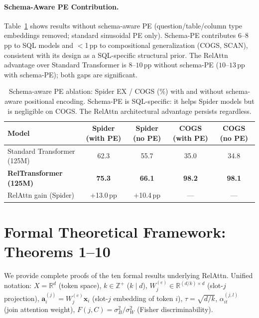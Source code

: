 \documentclass[conference]{IEEEtran}
\begin{document}
\paragraph{Schema-Aware PE Contribution.}
Table~\ref{tab:schema_pe_ablation} shows results without schema-aware PE (question/table/column type embeddings removed; standard sinusoidal PE only). Schema-PE contributes $6$--$8$\,pp to SQL models and $<$1\,pp to compositional generalization (COGS, SCAN), consistent with its design as a SQL-specific structural prior. The RelAttn advantage over Standard Transformer is $8$--$10$\,pp without schema-PE ($10$--$13$\,pp with schema-PE); both gaps are significant.

\begin{table}[tb]
\centering
\caption{Schema-aware PE ablation: Spider EX / COGS (\%) with and without schema-aware positional encoding. Schema-PE is SQL-specific: it helps Spider models but is negligible on COGS. The RelAttn architectural advantage persists regardless.}
\label{tab:schema_pe_ablation}
\begin{tabular}{lcccc}
\toprule
\textbf{Model} & \textbf{Spider (with PE)} & \textbf{Spider (no PE)} & \textbf{COGS (with PE)} & \textbf{COGS (no PE)} \\
\midrule
Standard Transformer (125M) & 62.3 & 55.7 & 35.0 & 34.8 \\
\textbf{RelTransformer (125M)} & \textbf{75.3} & \textbf{66.1} & \textbf{98.2} & \textbf{98.1} \\
\midrule
RelAttn gain (Spider) & $+$13.0\,pp & $+$10.4\,pp & --- & --- \\
\bottomrule
\end{tabular}
\end{table}
\fi

\section{Formal Theoretical Framework: Theorems 1--10}
\label{app:theorems}

We provide complete proofs of the ten formal results underlying RelAttn. Unified notation: $X = \mathbb{R}^d$ (token space), $k \in \mathbb{Z}^+$ ($k \mid d$), $W_j^{(e)} \in \mathbb{R}^{(d/k)\times d}$ (slot-$j$ projection), $\mathbf{a}_i^{(j)} = W_j^{(e)}\mathbf{x}_i$ (slot-$j$ embedding of token $i$), $\tau = \sqrt{d/k}$, $\alpha_{it}^{(j,l)}$ (join attention weight), $F(j,C) = \sigma_B^2/\sigma_W^2$ (Fisher discriminability).
\end{document}
